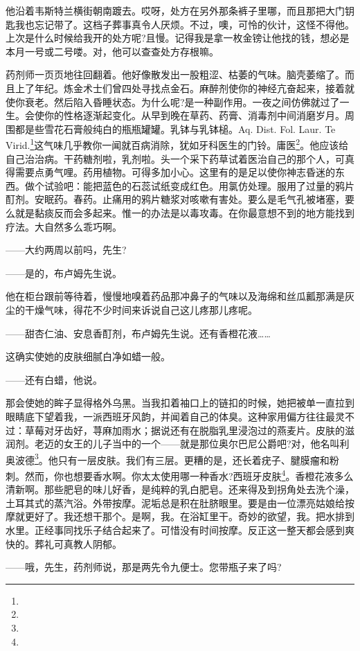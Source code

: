 \par 他沿着韦斯特兰横街朝南踱去。哎呀，处方在另外那条裤子里哪，而且那把大门钥匙我也忘记带了。这档子葬事真令人厌烦。不过，噢，可怜的伙计，这怪不得他。上次是什么时候给我开的处方呢?且慢。记得我是拿一枚金镑让他找的钱，想必是本月一号或二号喽。对，他可以查查处方存根嘛。
\par 药剂师一页页地往回翻着。他好像散发出一股粗涩、枯萎的气味。脑壳萎缩了。而且上了年纪。炼金术士们曾四处寻找点金石。麻醉剂使你的神经亢奋起来，接着就使你衰老。然后陷入昏睡状态。为什么呢?是一种副作用。一夜之间仿佛就过了一生。会使你的性格逐渐起变化。从早到晚在草药、药膏、消毒剂中间消磨岁月。周围都是些雪花石膏般纯白的瓶瓶罐罐。乳钵与乳钵槌。Aq. Dist. Fol. Laur. Te Virid.\footnote{}这气味几乎教你一闻就百病消除，犹如牙科医生的门铃。庸医\footnote{}。他应该给自己治治病。干药糖剂啦，乳剂啦。头一个采下药草试着医治自己的那个人，可真得需要点勇气哩。药用植物。可得多加小心。这里有的是足以使你神志昏迷的东西。做个试验吧：能把蓝色的石蕊试纸变成红色。用氯仿处理。服用了过量的鸦片酊剂。安眠药。春药。止痛用的鸦片糖浆对咳嗽有害处。要么是毛气孔被堵塞，要么就是黏痰反而会多起来。惟一的办法是以毒攻毒。在你最意想不到的地方能找到疗法。大自然多么乖巧啊。
\par ——大约两周以前吗，先生?
\par ——是的，布卢姆先生说。
\par 他在柜台跟前等待着，慢慢地嗅着药品那冲鼻子的气味以及海绵和丝瓜瓤那满是灰尘的干燥气味，得花不少时间来诉说自己这儿疼那儿疼呢。
\par ——甜杏仁油、安息香酊剂，布卢姆先生说。还有香橙花液……
\par 这确实使她的皮肤细腻白净如蜡一般。
\par ——还有白蜡，他说。
\par 那会使她的眸子显得格外乌黑。当我扣着袖口上的链扣的时候，她把被单一直拉到眼睛底下望着我，一派西班牙风韵，并闻着自己的体臭。这种家用偏方往往最灵不过：草莓对牙齿好，荨麻加雨水；据说还有在脱脂乳里浸泡过的燕麦片。皮肤的滋润剂。老迈的女王的儿子当中的一个——就是那位奥尔巴尼公爵吧?对，他名叫利奥波德\footnote{}。他只有一层皮肤。我们有三层。更糟的是，还长着疣子、腱膜瘤和粉刺。然而，你也想要香水啊。你太太使用哪一种香水?西班牙皮肤\footnote{}。香橙花液多么清新啊。那些肥皂的味儿好香，是纯粹的乳白肥皂。还来得及到拐角处去洗个澡，土耳其式的蒸汽浴。外带按摩。泥垢总是积在肚脐眼里。要是由一位漂亮姑娘给按摩就更好了。我还想干那个。是啊，我。在浴缸里干。奇妙的欲望，我。把水排到水里。正经事同找乐子结合起来了。可惜没有时间按摩。反正这一整天都会感到爽快的。葬礼可真教人阴郁。
\par ——哦，先生，药剂师说，那是两先令九便士。您带瓶子来了吗?
